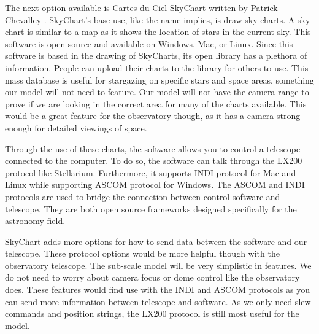 \documentclass[12pt]{report}
\begin{document}
The next option available is Cartes du Ciel-SkyChart written by Patrick Chevalley \cite{skychart}. SkyChart's base use, like the name implies, is draw sky charts. A sky chart is similar to a map as it shows the location of stars in the current sky. This software is open-source and available on Windows, Mac, or Linux. Since this software is based in the drawing of SkyCharts, its open library has a plethora of information. People can upload their charts to the library for others to use. This mass database is useful for stargazing on specific stars and space areas, something our model will not need to feature. Our model will not have the camera range to prove if we are looking in the correct area for many of the charts available. This would be a great feature for the observatory though, as it has a camera strong enough for detailed viewings of space.

Through the use of these charts, the software allows you to control a telescope connected to the computer. To do so, the software can talk through the LX200 protocol like Stellarium. Furthermore, it supports INDI protocol for Mac and Linux while supporting ASCOM protocol for Windows. The ASCOM and INDI protocols are used to bridge the connection between control software and telescope. They are both open source frameworks designed specifically for the astronomy field.

SkyChart adds more options for how to send data between the software and our telescope. These protocol options would be more helpful though with the observatory telescope. The sub-scale model will be very simplistic in features. We do not need to worry about camera focus or dome control like the observatory does. These features would find use with the INDI and ASCOM protocols as you can send more information between telescope and software. As we only need slew commands and position strings, the LX200 protocol is still most useful for the model.

\newpage %
\end{document}
